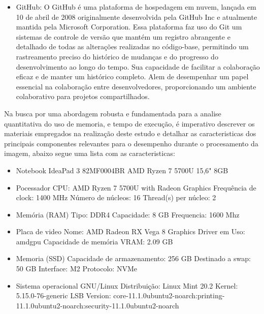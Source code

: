 \begin{itemize}
    \item GitHub: O GitHub é uma plataforma de hospedagem em nuvem, lançada em 10 de abril de 2008 originalmente desenvolvida pela GitHub Inc e atualmente mantida pela Microsoft Corporation. Essa plataforma faz uso do Git um sistemas de controle de versão que mantém um registro abrangente e detalhado de todas as alterações realizadas no código-base, permitindo um rastreamento preciso do histórico de mudanças e do progresso do desenvolvimento ao longo do tempo. Sua capacidade de facilitar a colaboração eficaz e de manter um histórico completo. Alem de desempenhar um papel essencial na colaboração entre desenvolvedores, proporcionando um ambiente colaborativo para projetos compartilhados\cite{github}.

 \end{itemize}

Na busca por uma abordagem robusta e fundamentada para a analise quantitativa do uso de memoria, e tempo de execução, é imperativo descrever os materiais empregados na realização deste estudo e detalhar as caracteristicas dos principais componentes relevantes para o desempenho durante o procesamento da imagem, abaixo segue uma lista com as caracteristicas:

\begin{itemize}

\item Notebook IdeaPad 3 82MF0004BR AMD Ryzen 7 5700U 15,6" 8GB 

\item Pocessador
\subitem CPU: AMD Ryzen 7 5700U with Radeon Graphics
\subitem Frequência de clock: 1400 MHz
\subitem Número de núcleos: 16
\subitem Thread(s) per núcleo: 2

\item Memória (RAM)
\subitem Tipo: DDR4
\subitem Capacidade: 8 GB
\subitem Frequencia: 1600 Mhz

\item Placa de video
\subitem Nome: AMD Radeon RX Vega 8 Graphics
\subitem Driver em Uso: amdgpu
\subitem Capacidade de memória VRAM: 2.09 GB

\item Memoria (SSD)
\subitem Capacidade de armazenamento: 256 GB
\subitem Destinado a swap: 50 GB
\subitem Interface: M2
\subitem Protocolo: NVMe

\item Sistema operacional GNU/Linux
\subitem Distribuição: Linux Mint 20.2
\subitem Kernel: 5.15.0-76-generic
\subitem LSB Version: core-11.1.0ubuntu2-noarch:printing-11.1.0ubuntu2-noarch:security-11.1.0ubuntu2-noarch




\end{itemize}


